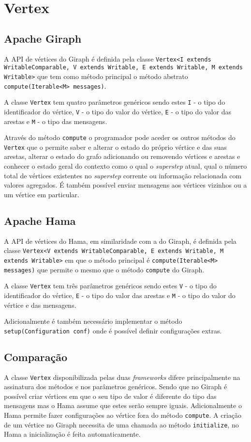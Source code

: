 \newpage
\section*{Vertex}

\subsection*{Apache Giraph}

A API de vértices do Giraph é definida pela classe \texttt{Vertex<I extends WritableComparable, V extends Writable, E extends Writable, M extends Writable>} que tem como método principal o método abstrato \texttt{compute(Iterable<M> messages)}.

A classe \texttt{Vertex} tem quatro parâmetros genéricos sendo estes \texttt{I} - o tipo do identificador do vértice, \texttt{V} - o tipo do valor do vértice, \texttt{E} - o tipo do valor das arestas e \texttt{M} - o tipo das mensagens.


Através do método \texttt{compute} o programador pode aceder os outros métodos do \texttt{Vertex} que o permite saber e alterar o estado do próprio vértice e das suas arestas, alterar o estado do grafo adicionando ou removendo vértices e arestas e conhecer o estado geral do contexto como o qual o \textit{superstep} atual, qual o número total de vértices existentes no \textit{superstep} corrente ou informação relacionada com valores agregados. É também possível enviar mensagens aos vértices vizinhos ou a um vértice em particular.



\subsection*{Apache Hama}
A API de vértices do Hama, em similaridade com a do Giraph, é definida pela classe \texttt{Vertex<V extends WritableComparable, E extends Writable, M extends Writable>} em que o método principal é \texttt{compute(Iterable<M> messages)} que permite o mesmo que o método \texttt{compute} do Giraph.

A classe \texttt{Vertex} tem três parâmetros genéricos sendo estes \texttt{V} - o tipo do identificador do vértice, \texttt{E} - o tipo do valor das arestas e \texttt{M} - o tipo do valor do vértice e das mensagens.


Adicionalmente é também necessário implementar o método \texttt{setup(Configuration conf)} onde é possível definir configurações extras.
\subsection*{Comparação}

A classe \texttt{Vertex} disponibilizada pelas duas \textit{frameworks} difere principalmente na assinatura dos métodos e nos parâmetros genéricos. Sendo que no Giraph é possível criar vértices em que o seu tipo de valor é diferente do tipo das mensagens mas o Hama assume que estes serão sempre iguais. Adicionalmente o Hama permite fazer configurações ao vértice fora do método \texttt{compute}. A criação de um vértice no Giraph necessita de uma chamada ao método \texttt{initialize}, no Hama a inicialização é feita automaticamente.